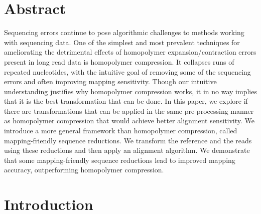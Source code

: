 \documentclass[
  11pt,
  twoside]{scrbook}
\begin{document}
\newcommand{\stirling}[2]{\bigg\{%
\begin{matrix}
    #1 \\
    #2
\end{matrix}
\bigg\} }
\newcommand{\comb}[2]{\bigg(
\begin{matrix}
    #1 \\
    #2
\end{matrix}
\bigg) }

\newcommand{\lmer}{$\ell$-mer\xspace}
\newcommand{\lmers}{$\ell$-mers\xspace}
\newcommand{\iscomp}{\textsc{IsComp}\xspace}
\newcommand{\rccore}{RC-core-insensitive\xspace}
\newcommand{\minimap}{\texttt{minimap2}\xspace}
\newcommand{\winnowmap}{\texttt{winnowmap2}\xspace}
\newcommand{\msr}[1]{MSR$_{\text{#1}}$}

\hypertarget{hpc-abstract}{%
\section*{Abstract}\label{hpc-abstract}}

Sequencing errors continue to pose algorithmic challenges to methods working
with sequencing data. One of the simplest and most prevalent techniques for
ameliorating the detrimental effects of homopolymer expansion/contraction errors
present in long read data is homopolymer compression. It collapses runs of
repeated nucleotides, with the intuitive goal of removing some of the sequencing
errors and often improving mapping sensitivity. Though our intuitive
understanding justifies why homopolymer compression works, it in no way implies
that it is the best transformation that can be done. In this paper, we explore
if there are transformations that can be applied in the same pre-processing
manner as homopolymer compression that would achieve better alignment
sensitivity. We introduce a more general framework than homopolymer compression,
called mapping-friendly sequence reductions. We transform the reference and the
reads using these reductions and then apply an alignment algorithm. We
demonstrate that some mapping-friendly sequence reductions lead to improved
mapping accuracy, outperforming homopolymer compression.

\hypertarget{hpc-introduction}{%
\section{Introduction}\label{hpc-introduction}}
\end{document}
